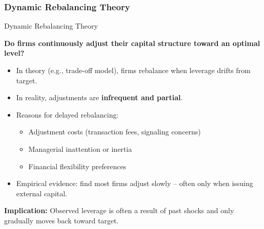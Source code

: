 \subsubsection{Dynamic Rebalancing Theory}
\begin{frame}{Dynamic Rebalancing Theory}
	
	\textbf{Do firms continuously adjust their capital structure toward an optimal level?}
	
	\begin{itemize}
		\item In theory (e.g., trade-off model), firms rebalance when leverage drifts from target.
		\item In reality, adjustments are \textbf{infrequent and partial}.
		\item Reasons for delayed rebalancing:
		\begin{itemize}
			\item Adjustment costs (transaction fees, signaling concerns)
			\item Managerial inattention or inertia
			\item Financial flexibility preferences
		\end{itemize}
		\item Empirical evidence:  
		\textcite{leary2005revolving} find most firms adjust slowly -- often only when issuing external capital.
	\end{itemize}
	
	\vspace{0.3cm}
	\textbf{Implication:}  
	Observed leverage is often a result of past shocks and only gradually moves back toward target.
	
\end{frame}

